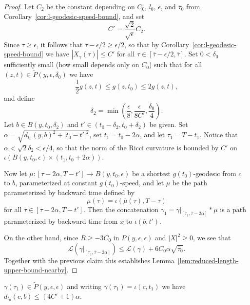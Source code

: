 \begin{proof}
\sketch
{}
Let $C_2$ be the constant depending on $C_0$, $l_0$, $\epsilon$, and
$\bar\tau_0$ from Corollary~\ref{cor:l-geodesic-speed-bound}, and set
$$C'=\frac{\sqrt{2}}{\sqrt{\epsilon}}C_2.$$
Since $\bar\tau\ge \epsilon$, it follows that
$\bar\tau-\epsilon/2\ge \epsilon/2$, so that by
Corollary~\ref{cor:l-geodesic-speed-bound} we have $|X_\gamma(\tau)|\le C'$ for all
$\tau\in [\bar\tau-\epsilon/2,\bar\tau]$. Set $0<\delta_0$
sufficiently small (how small depends only on $C_0$) such that for
all $(z,t)\in \tilde P(y,\epsilon,\delta_0)$ we have
$$\frac{1}{2}g(z,t)\le g(z,t_0)\le 2g(z,t),$$ and define
$$\delta_2=\min\left(\frac{\epsilon}{8},\frac{\epsilon}{8C'},\frac{\delta_0}{4}\right).$$
 Let $b\in B(y,t_0,\delta_2)$ and $t'\in
(t_0-\delta_2,t_0+\delta_2)$ be given. Set
$\alpha=\sqrt{d_{t_0}(y,b)^2+|t_0-t'|^2}$, set $t_1=t_0-2\alpha$,
and let $\tau_1=T-t_1$. Notice that
$\alpha<\sqrt{2}\delta_2<\epsilon/4$, so that the norm of the Ricci
curvature is bounded by $C'$ on
$\iota(B(y,t_0,\epsilon)\times(t_1,t_0+2\alpha))$.



Now let $\overline\mu\colon [\bar\tau-2\alpha,T-t']\to
B(y,t_0,\epsilon)$ be a shortest $g(t_0)$-geodesic from $c$ to $b$,
parameterized at constant $g(t_0)$-speed, and let $\mu$ be the path
parameterized by backward time defined by
$$\mu(\tau)=\iota(\overline\mu(\tau),T-\tau)$$
for all $\tau\in [\bar\tau-2\alpha,T-t']$. Then the concatenation
$\gamma_1=\gamma|_{[\tau_1,\bar\tau-2\alpha]}*\mu$ is a path
parameterized by backward time from $x$ to $\iota(b,t')$.





On the other hand, since $R\ge -3C_0$ in $P(y,\epsilon,\epsilon)$
and $|X|^2\ge 0$, we see that
$${\mathcal L}(\gamma|_{[\tau_1,\bar\tau-2\alpha]})\le {\mathcal L}(\gamma)
+ 6C_0\alpha\sqrt{\bar\tau_0}.$$  Together with the previous claim
this establishes Lemma~\ref{lem:reduced-length-upper-bound-nearby}.
\end{proof}

\begin{claim}\label{claim:l-geodesic-endpoint-close-to-ball}
\label{6.66}

$\gamma(\tau_1)\in \widetilde P(y,\epsilon,\epsilon)$ and writing
$\gamma(\tau_1)=\iota(c,t_1)$ we have $d_{t_0}(c,b)\le
(4C'+1)\alpha$.
\end{claim}

